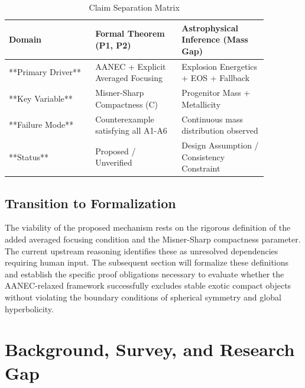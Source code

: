 \documentclass[conference]{IEEEtran}
\begin{document}
\begin{table}[htbp]
\centering
\small


\caption{Claim Separation Matrix}
\label{tab:introduction-intro-block-3}
\begin{tabular}{|p{0.29\linewidth}|p{0.29\linewidth}|p{0.29\linewidth}|}
\hline
Domain & Formal Theorem (P1, P2) & Astrophysical Inference (Mass Gap) \\\hline
**Primary Driver** & AANEC + Explicit Averaged Focusing & Explosion Energetics + EOS + Fallback \\\hline
**Key Variable** & Misner-Sharp Compactness (C) & Progenitor Mass + Metallicity \\\hline
**Failure Mode** & Counterexample satisfying all A1-A6 & Continuous mass distribution observed \\\hline
**Status** & Proposed / Unverified & Design Assumption / Consistency Constraint \\\hline
\end{tabular}
\end{table}

\subsection{Transition to Formalization}
The viability of the proposed mechanism rests on the rigorous definition of the added averaged focusing condition and the Misner-Sharp compactness parameter. The current upstream reasoning identifies these as unresolved dependencies requiring human input. The subsequent section will formalize these definitions and establish the specific proof obligations necessary to evaluate whether the AANEC-relaxed framework successfully excludes stable exotic compact objects without violating the boundary conditions of spherical symmetry and global hyperbolicity.

\section{Background, Survey, and Research Gap}
\end{document}
